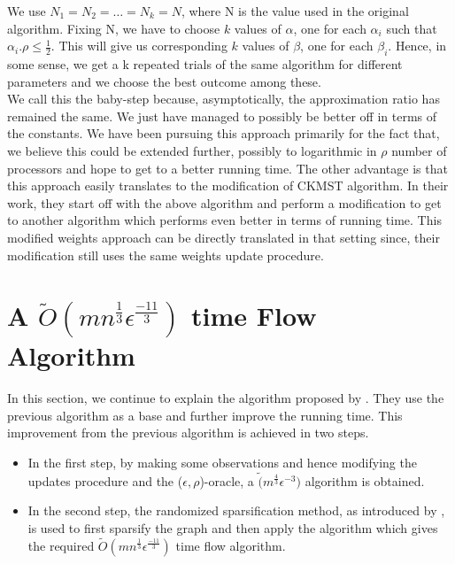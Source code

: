 \documentclass[BTech]{iitmdiss}
\begin{document}
	    We use $N_1 = N_2 = \ldots = N_k = N$, where N is the value used in the original algorithm. Fixing N, we have to choose 
	    $k$ values of $\alpha$, one for each $\alpha_i$ such that $\alpha_i.\rho \leq \frac{1}{2}$. This will give us corresponding $k$ values of 
	    $\beta$, one for each $\beta_i$. Hence, in some sense, we get a k repeated trials of the same algorithm for different parameters and 
	    we choose the best outcome among these. \\
	    
	    We call this the baby-step because, asymptotically, the approximation ratio has remained the same. We just have managed to possibly be 
	    better off in terms of the constants. We have been pursuing this approach primarily for the fact that, we believe this could be extended
	    further, possibly to logarithmic in $\rho$ number of processors and hope to get to a better running time. The other advantage is that 
	    this approach easily translates to the modification of CKMST algorithm. In their work, they start off with the above algorithm and perform a modification
	    to get to another algorithm which performs even better in terms of running time. This modified weights approach can be directly translated in that 
	    setting since, their modification still uses the same weights update procedure.

	    
	    \section{A $\widetilde{O}(m n^{\frac{1}{3}}\epsilon^{\frac{-11}{3}})$ time Flow Algorithm}
	      In this section, we continue to explain the algorithm proposed by \cite{DBLP:journals/corr/abs-1010-2921}. They use the previous algorithm as a base and further improve 
	      the running time. This improvement from the previous algorithm is achieved in two steps.
	      \begin{itemize}
	       \item 
		In the first step, by making some observations and hence modifying the updates procedure and the ($\epsilon, \rho$)-oracle, a
		$\widetilde(m^{\frac{4}{3}}\epsilon^{-3})$ algorithm is obtained.
	      \item
		 In the second step, the randomized sparsification method, as introduced by \cite{Benczur:1996:ASM:237814.237827}, is used to first 
		 sparsify the graph and then apply the algorithm which gives the required $\widetilde{O}(m n^{\frac{1}{3}}\epsilon^{\frac{-11}{3}})$
		 time flow algorithm.
	      \end{itemize}
	      
\end{document}
